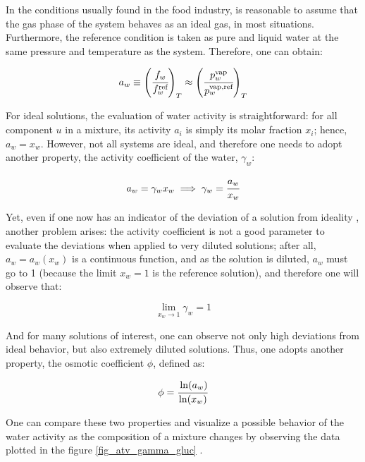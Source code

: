 In the conditions usually found in the food industry, is reasonable to assume
that the gas phase of the system behaves as an ideal gas\cite{canovas2007},
in most situations. Furthermore, the reference condition is taken as pure and liquid
water at the same pressure and temperature as the system. Therefore, one can obtain:

\begin{equation}
	\label{eq:def_atv}
	a_w \equiv \left(\cfrac{f_w}{f^\text{ref}_w}\right)_T%
		\approx \left(\cfrac{p^\text{vap}_w}{p^\text{vap,ref}_w}\right)_T
\end{equation}

For ideal solutions, the evaluation of water activity is straightforward: for all
component $u$ in a mixture, its activity $a_i$ is simply its molar fraction $x_i$;
hence, $a_w = x_w$. However, not all systems are ideal, and therefore one needs to
adopt another property, the activity coefficient of the water, $\gamma_w$:

\begin{equation}
	a_w = \gamma_wx_w \implies \gamma_w = \cfrac{a_w}{x_w}
\end{equation}

Yet, even if one now has an indicator of the deviation of a solution from
ideality , another problem arises: the activity coefficient is not a good
parameter to evaluate the deviations when applied to very diluted solutions;
after all, $a_w=a_w(x_w)$ is a continuous function, and as the solution is diluted,
$a_w$ must go to 1 (because the limit $x_w=1$ is the reference solution), and
therefore one will observe that:

\begin{equation}
	\lim_{x_w \to 1}\gamma_w = 1
\end{equation}

And for many solutions of interest, one can observe not only high deviations from
ideal behavior, but also extremely diluted solutions. Thus, one adopts another
property, the osmotic coefficient $\phi$, defined as:

\begin{equation}
	\phi = \cfrac{\ln(a_w)}{\ln(x_w)}
\end{equation}

One can compare these two properties and visualize a possible behavior of
the water activity as the composition of a mixture changes by observing
the data plotted in the figure \ref{fig_atv_gamma_gluc} \cite{ebrahimi2016}.

